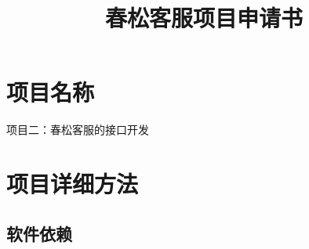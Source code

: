 \documentclass{article}
\title{春松客服项目申请书}
\date{}
\begin{document}
\maketitle
\hypertarget{ux9879ux76eeux540dux79f0}{%
\section{项目名称}\label{ux9879ux76eeux540dux79f0}}

项目二：春松客服的接口开发

\hypertarget{ux9879ux76eeux8be6ux7ec6ux65b9ux6cd5}{%
\section{项目详细方法}\label{ux9879ux76eeux8be6ux7ec6ux65b9ux6cd5}}

\hypertarget{ux8f6fux4ef6ux4f9dux8d56}{%
\subsection{软件依赖}\label{ux8f6fux4ef6ux4f9dux8d56}}
\end{document}
